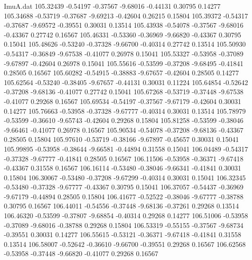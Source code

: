 \begin{filecontents}{ImuA.dat}
 105.32439   -0.54197   -0.37567   -9.68016   -0.44131    0.30795    0.14277
 105.34688   -0.53719   -0.37687   -9.69213   -0.42604    0.26215    0.15804
 105.39372   -0.54317   -0.37687   -9.69572   -0.39551    0.30031    0.13514
 105.43938   -0.54078   -0.37567   -9.68016   -0.43367    0.27742    0.16567
 105.46331   -0.53360   -0.36969   -9.66820   -0.43367    0.30795    0.15041
 105.48626   -0.53240   -0.37328   -9.66700   -0.40314    0.27742    0.13514
 105.50930   -0.54317   -0.36849   -9.67538   -0.41077    0.26978    0.15041
 105.53327   -0.53958   -0.37089   -9.67897   -0.42604    0.26978    0.15041
 105.55616   -0.53599   -0.37208   -9.68495   -0.41841    0.28505    0.16567
 105.60282   -0.54915   -0.38883   -9.67657   -0.42604    0.28505    0.14277
 105.62564   -0.53240   -0.38405   -9.67657   -0.44131    0.30031    0.11224
 105.64854   -0.52642   -0.37208   -9.68136   -0.41077    0.27742    0.15041
 105.67268   -0.53719   -0.37448   -9.67538   -0.41077    0.29268    0.16567
 105.69534   -0.54197   -0.37567   -9.67179   -0.42604    0.30031    0.14277
 105.76663   -0.53958   -0.37328   -9.67777   -0.40314    0.30031    0.13514
 105.78979   -0.53599   -0.36610   -9.65743   -0.42604    0.29268    0.15804
 105.81258   -0.53599   -0.38046   -9.66461   -0.41077    0.26978    0.16567
 105.90534   -0.54078   -0.37208   -9.68136   -0.43367    0.28505    0.15804
 105.97610   -0.53719   -0.38166   -9.67897   -0.45657    0.30031    0.15041
 105.99895   -0.53958   -0.38644   -9.66581   -0.44894    0.31558    0.15041
 106.04489   -0.54317   -0.37328   -9.67777   -0.41841    0.28505    0.16567
 106.11506   -0.53958   -0.36371   -9.67418   -0.43367    0.31558    0.16567
 106.16114   -0.53480   -0.38046   -9.66341   -0.41841    0.30031    0.15804
 106.30067   -0.53480   -0.37208   -9.67299   -0.40314    0.30031    0.15041
 106.32345   -0.53480   -0.37328   -9.67777   -0.43367    0.30795    0.15041
 106.37057   -0.54437   -0.36969   -9.67179   -0.44894    0.28505    0.15804
 106.41677   -0.52522   -0.38046   -9.67777   -0.38788    0.30795    0.16567
 106.44011   -0.54556   -0.37448   -9.68136   -0.37261    0.29268    0.13514
 106.46320   -0.53599   -0.37807   -9.68854   -0.40314    0.29268    0.14277
 106.51006   -0.53958   -0.37089   -9.68016   -0.38788    0.29268    0.15804
 106.53319   -0.55155   -0.37567   -9.68734   -0.39551    0.30031    0.14277
 106.55615   -0.53121   -0.36371   -9.67418   -0.41841    0.31558    0.13514
 106.58007   -0.52642   -0.36610   -9.66700   -0.39551    0.29268    0.16567
 106.62568   -0.53958   -0.37448   -9.66820   -0.41077    0.29268    0.16567

\end{filecontents}
